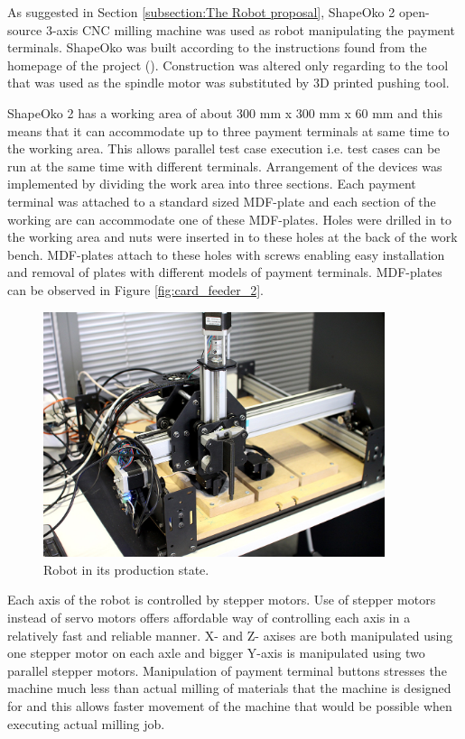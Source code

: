 As suggested in Section \ref{subsection:The Robot proposal}, ShapeOko 2 open-source 3-axis CNC milling machine was used as robot manipulating the payment terminals. ShapeOko was built according to the instructions found from the homepage of the project (\emph{\cite{shapeoko}}). Construction was altered only regarding to the tool that was used as the spindle motor was substituted by 3D printed pushing tool.

ShapeOko 2 has a working area of about 300 mm x 300 mm x 60 mm and this means that it can accommodate up to three payment terminals at same time to the working area. This allows parallel test case execution i.e. test cases can be run at the same time with different terminals. Arrangement of the devices was implemented by dividing the work area into three sections. Each payment terminal was attached to a standard sized MDF-plate and each section of the working are can accommodate one of these MDF-plates. Holes were drilled in to the working area and nuts were inserted in to these holes at the back of the work bench. MDF-plates attach to these holes with screws enabling easy installation and removal of plates with different models of payment terminals. MDF-plates can be observed in Figure \ref{fig:card_feeder_2}.

\begin{figure}[ht]
  \begin{center}
    \includegraphics[width=10cm]{images/robot.jpg}
    \caption{Robot in its production state.}
    \label{fig:robot_final}
  \end{center}
\end{figure}
\FloatBarrier

Each axis of the robot is controlled by stepper motors. Use of stepper motors instead of servo motors offers affordable way of controlling each axis in a relatively fast and reliable manner. X- and Z- axises are both manipulated using one stepper motor on each axle and bigger Y-axis is manipulated using two parallel stepper motors. Manipulation of payment terminal buttons stresses the machine much less than actual milling of materials that the machine is designed for and this allows faster movement of the machine that would be possible when executing actual milling job.

